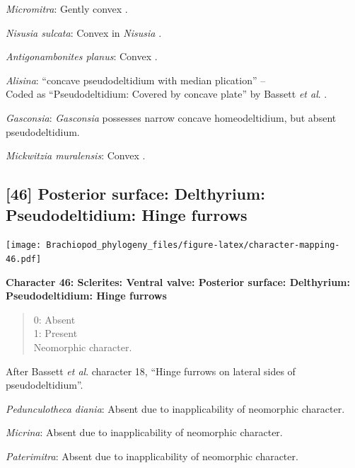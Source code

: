 \documentclass[]{book}
\theoremstyle{definition}
\theoremstyle{definition}
\theoremstyle{definition}
\theoremstyle{remark}
\begin{document}
\emph{Micromitra}: Gently convex \citep[see][fig.
83.3]{Williams2000BrachiopodaLinguliformea}.

\emph{Nisusia sulcata}: Convex in \emph{Nisusia} \citep[see][fig.
8.4]{Rowell1985Theevolutionary}.

\emph{Antigonambonites planus}: Convex \citep[fig.
508]{Williams2000BrachiopodaLinguliformea}.

\emph{Alisina}: ``concave pseudodeltidium with median plication'' --
\citet{Williams2000BrachiopodaLinguliformea}\\
Coded as ``Pseudodeltidium: Covered by concave plate'' by Bassett
\emph{et al}. \citeyearpar{Bassett2001Functionalmorphology}.

\emph{Gasconsia}: \emph{Gasconsia} possesses narrow concave
homeodeltidium, but absent pseudodeltidium.

\emph{Mickwitzia muralensis}: Convex \citep[see][fig.
4B]{Balthasar2004Shellstructure}.

\hypertarget{posterior-surface-delthyrium-pseudodeltidium-hinge-furrows}{%
\subsection*{{[}46{]} Posterior surface: Delthyrium: Pseudodeltidium:
Hinge
furrows}\label{posterior-surface-delthyrium-pseudodeltidium-hinge-furrows}}

\texttt{[image: Brachiopod\_phylogeny\_files/figure-latex/character-mapping-46.pdf]}

\textbf{Character 46: Sclerites: Ventral valve: Posterior surface:
Delthyrium: Pseudodeltidium: Hinge furrows}

\begin{quote}
0: Absent\\
1: Present\\
Neomorphic character.
\end{quote}

After Bassett \emph{et al}.
\citeyearpar{Bassett2001Functionalmorphology} character 18, ``Hinge
furrows on lateral sides of pseudodeltidium''.

\emph{Pedunculotheca diania}: Absent due to inapplicability of
neomorphic character.

\emph{Micrina}: Absent due to inapplicability of neomorphic character.

\emph{Paterimitra}: Absent due to inapplicability of neomorphic
character.
\end{document}
